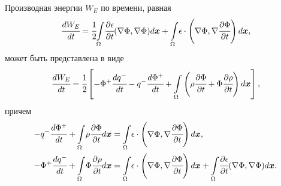 \begin{proposition}
\label{prop:energy_electrical_deriv_form}
Производная энергии $W_E$ по времени, равная
\begin{equation}
    \cfrac{d W_E}{dt} = \cfrac{1}{2} {\int\limits_\Omega} \cfrac{\partial \epsilon}{\partial t} (\nabla \Phi, \nabla \Phi) d {\boldsymbol{x}} + {\int\limits_\Omega} \epsilon \cdot \left( \nabla \Phi, \nabla \cfrac{\partial \Phi}{\partial t} \right) d {\boldsymbol{x}},
    \label{eq:energy_electrical_deriv}
\end{equation}
может быть представлена в виде
\begin{equation}
    \cfrac{d W_E}{dt} = \cfrac{1}{2} \left[ -\Phi^+ \cfrac{d q^-}{dt} - q^- \cfrac{d \Phi^+}{dt} + {\int\limits_\Omega} \left( \rho \cfrac{\partial \Phi}{\partial t} + \Phi \cfrac{\partial \rho}{\partial t} \right) d {\boldsymbol{x}} \right],
    \label{eq:energy_electrical_deriv_form}
\end{equation}
причем
\begin{subequations}
\label{eq:energy_electrical_deriv_terms}
\begin{align}
    -q^- \cfrac{d \Phi^+}{dt} + {\int\limits_\Omega} \rho \cfrac{\partial \Phi}{\partial t} d {\boldsymbol{x}} & = {\int\limits_\Omega} \epsilon \cdot \left( \nabla \Phi, \nabla \cfrac{\partial \Phi}{\partial t} \right) d {\boldsymbol{x}},
    \label{eq:energy_electrical_deriv_term_a} \\
    -\Phi^+ \cfrac{d q^-}{dt} + {\int\limits_\Omega} \Phi \cfrac{\partial \rho}{\partial t} d {\boldsymbol{x}} & = {\int\limits_\Omega} \epsilon \cdot \left( \nabla \Phi, \nabla \cfrac{\partial \Phi}{\partial t} \right) d {\boldsymbol{x}} + {\int\limits_\Omega} \cfrac{\partial \epsilon}{\partial t} (\nabla \Phi, \nabla \Phi) d {\boldsymbol{x}}.
    \label{eq:energy_electrical_deriv_term_b}
\end{align}
\end{subequations}
\end{proposition}
